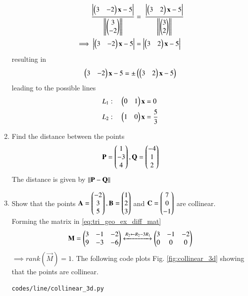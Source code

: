 \begin{enumerate}[label=\arabic*.,ref=\thesubsection.\theenumi]
%
\begin{align}
\frac{\left\vert\begin{pmatrix}3 & -2\end{pmatrix}\mathbf{x}  - 5\right\vert}{\left\lVert\begin{pmatrix}3 \\ -2\end{pmatrix}\right\rVert}
&=\
\frac{\left\vert\begin{pmatrix}3 & 2\end{pmatrix}\mathbf{x}  - 5\right\vert}{\left\lVert\begin{pmatrix}3 \\ 2\end{pmatrix}\right\rVert}
\\
\implies \left\vert\begin{pmatrix}3 & -2\end{pmatrix}\mathbf{x}  - 5\right\vert&=\left\vert\begin{pmatrix}3 & 2\end{pmatrix}\mathbf{x}  - 5\right\vert
\end{align}
%
resulting in 
%
\begin{align}
\begin{pmatrix}3 & -2\end{pmatrix}\mathbf{x}  - 5=\pm\left(\begin{pmatrix}3 & 2\end{pmatrix}\mathbf{x}  - 5\right)
\end{align}
%
leading to the possible lines
%
\begin{align}
L_1: \quad \begin{pmatrix}0 & 1\end{pmatrix}\mathbf{x}  &=0
\\
L_2: \quad \begin{pmatrix}1 & 0\end{pmatrix}\mathbf{x}  &=  \frac{5}{3}
\end{align}
%
\item Find the distance between the points
%
\begin{align}
\mathbf{P} = \begin{pmatrix}1\\-3\\4\end{pmatrix},
\mathbf{Q} = \begin{pmatrix}-4\\1\\2\end{pmatrix}
\end{align}
%
\solution The distance is given by $\left\lVert\mathbf{P}-\mathbf{Q}\right\rVert$
\item Show that the points 
\label{prob:line_coll_3d}
$
\mathbf{A}=\begin{pmatrix}-2\\3\\5\end{pmatrix}, 
\mathbf{B}=\begin{pmatrix}1\\2\\3\end{pmatrix}$ 
and 
$ \mathbf{C}=\begin{pmatrix}7\\0\\-1\end{pmatrix}$ 
are collinear.
%
\\
\solution Forming the matrix in \eqref{eq:tri_geo_ex_diff_mat}
%
\begin{align}
\mathbf{M} = \begin{pmatrix}
3 & -1 & -2
\\
9 & -3 & -6
\end{pmatrix}
\xleftrightarrow {R_2\leftarrow R_2-3R_1}
\begin{pmatrix}
3 & -1 & -2
\\
0 & 0 & 0
\end{pmatrix}
\end{align}
%
$\implies rank(\vec{M}) = 1$.
%
The following code plots Fig. \ref{fig:collinear_3d} showing that the points are collinear.
%
\begin{lstlisting}
codes/line/collinear_3d.py
\end{lstlisting}
%
\begin{figure}[!ht]

\end{figure}
\end{enumerate}
